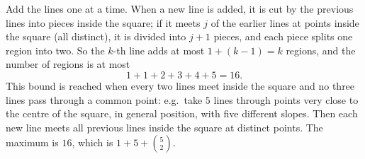Add the lines one at a time. When a new line is added, it is cut by the previous lines into pieces inside the square; if it meets $j$ of the earlier lines at points inside the square (all distinct), it is divided into $j+1$ pieces, and each piece splits one region into two. So the $k$-th line adds at most $1+(k-1)=k$ regions, and the number of regions is at most
\[
1+1+2+3+4+5=16 .
\]
This bound is reached when every two lines meet inside the square and no three lines pass through a common point: e.g.\ take $5$ lines through points very close to the centre of the square, in general position, with five different slopes. Then each new line meets all previous lines inside the square at distinct points. The maximum is $\boxed{16}$, which is $1+5+\binom52$.
